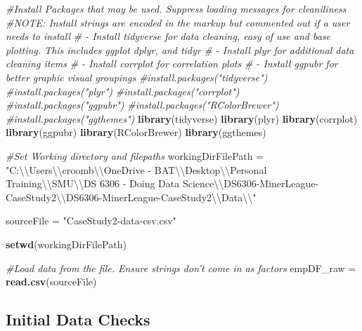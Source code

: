\documentclass[]{article}
\newenvironment{Shaded}{\begin{snugshade}}{\end{snugshade}}
\newcommand{\KeywordTok}[1]{\textcolor[rgb]{0.13,0.29,0.53}{\textbf{#1}}}
\newcommand{\CharTok}[1]{\textcolor[rgb]{0.31,0.60,0.02}{#1}}
\newcommand{\StringTok}[1]{\textcolor[rgb]{0.31,0.60,0.02}{#1}}
\newcommand{\CommentTok}[1]{\textcolor[rgb]{0.56,0.35,0.01}{\textit{#1}}}
\newcommand{\NormalTok}[1]{#1}
\begin{document}
\begin{Shaded}
\begin{Highlighting}[]
\CommentTok{#Install Packages that may be used. Suppress loading messages for cleaniliness}
\CommentTok{#NOTE: Install strings are encoded in the markup but commented out if a user needs to install}
\CommentTok{# - Install tidyverse for data cleaning, easy of use and base plotting. This includes ggplot dplyr, and tidyr}
\CommentTok{# - Install plyr for additional data cleaning items}
\CommentTok{# - Install corrplot for correlation plots}
\CommentTok{# - Install ggpubr for better graphic visual groupings}
\CommentTok{#install.packages("tidyverse")}
\CommentTok{#install.packages("plyr")}
\CommentTok{#install.packages("corrplot")}
\CommentTok{#install.packages("ggpubr")}
\CommentTok{#install.packages("RColorBrewer")}
\CommentTok{#install.packages("ggthemes")}
\KeywordTok{library}\NormalTok{(tidyverse)}
\KeywordTok{library}\NormalTok{(plyr)}
\KeywordTok{library}\NormalTok{(corrplot)}
\KeywordTok{library}\NormalTok{(ggpubr)}
\KeywordTok{library}\NormalTok{(RColorBrewer)}
\KeywordTok{library}\NormalTok{(ggthemes)}

\CommentTok{#Set Working directory and filepaths}
\NormalTok{workingDirFilePath =}\StringTok{ "C:}\CharTok{\textbackslash{}\textbackslash{}}\StringTok{Users}\CharTok{\textbackslash{}\textbackslash{}}\StringTok{croomb}\CharTok{\textbackslash{}\textbackslash{}}\StringTok{OneDrive - BAT}\CharTok{\textbackslash{}\textbackslash{}}\StringTok{Desktop}\CharTok{\textbackslash{}\textbackslash{}}\StringTok{Personal Training}\CharTok{\textbackslash{}\textbackslash{}}\StringTok{SMU}\CharTok{\textbackslash{}\textbackslash{}}\StringTok{DS 6306 - Doing Data Science}\CharTok{\textbackslash{}\textbackslash{}}\StringTok{DS6306-MinerLeague-CaseStudy2}\CharTok{\textbackslash{}\textbackslash{}}\StringTok{DS6306-MinerLeague-CaseStudy2}\CharTok{\textbackslash{}\textbackslash{}}\StringTok{Data}\CharTok{\textbackslash{}\textbackslash{}}\StringTok{"}

\NormalTok{sourceFile =}\StringTok{ "CaseStudy2-data-csv.csv"}

\KeywordTok{setwd}\NormalTok{(workingDirFilePath)}

\CommentTok{#Load data from the file. Ensure strings don't come in as factors}
\NormalTok{empDF_raw =}\StringTok{ }\KeywordTok{read.csv}\NormalTok{(sourceFile)}
\end{Highlighting}
\end{Shaded}

\subsection{Initial Data Checks}\label{initial-data-checks}
\end{document}
